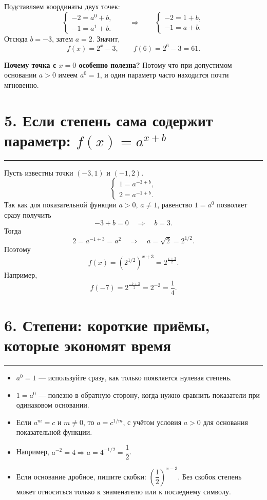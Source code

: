 \documentclass[a4paper,12pt]{article}
\newcommand{\sectionline}{\par\vspace{2pt}\noindent\color{accent}\rule{\linewidth}{0.6pt}\par\color{textgray}\vspace{4pt}}
\begin{document}
Подставляем координаты двух точек:
\[
\begin{cases}
-2=a^0+b,\\
-1=a^1+b.
\end{cases}
\qquad\Longrightarrow\qquad
\begin{cases}
-2=1+b,\\
-1=a+b.
\end{cases}
\]
Отсюда $b=-3$, затем $a=2$. Значит,
\[
  f(x)=2^x-3,
  \qquad
  f(6)=2^6-3=61.
\]

\textbf{Почему точка с $x=0$ особенно полезна?} Потому что при допустимом основании $a>0$ имеем $a^0=1$, и один параметр часто находится почти мгновенно.

\section*{5. Если степень сама содержит параметр: $f(x)=a^{x+b}$}
\sectionline
Пусть известны точки $(-3,1)$ и $(-1,2)$.
\[
\begin{cases}
1=a^{-3+b},\\
2=a^{-1+b}.
\end{cases}
\]
Так как для показательной функции $a>0$, $a\ne1$, равенство $1=a^0$ позволяет сразу получить
\[
-3+b=0\quad\Longrightarrow\quad b=3.
\]
Тогда
\[
2=a^{-1+3}=a^2
\quad\Longrightarrow\quad
 a=\sqrt2=2^{1/2}.
\]
Поэтому
\[
 f(x)=\left(2^{1/2}\right)^{x+3}=2^{\frac{x+3}{2}}.
\]
Например,
\[
 f(-7)=2^{\frac{-7+3}{2}}=2^{-2}=\frac14.
\]

\section*{6. Степени: короткие приёмы, которые экономят время}
\sectionline
\begin{itemize}
  \item $a^0=1$ — используйте сразу, как только появляется нулевая степень.
  \item $1=a^0$ — полезно в обратную сторону, когда нужно сравнить показатели при одинаковом основании.
  \item Если $a^m=c$ и $m\ne0$, то $a=c^{1/m}$, с учётом условия $a>0$ для основания показательной функции.
  \item Например, $a^{-2}=4 \Rightarrow a=4^{-1/2}=\dfrac12$.
  \item Если основание дробное, пишите скобки: $\left(\dfrac12\right)^{x-3}$. Без скобок степень может относиться только к знаменателю или к последнему символу.
\end{itemize}
\end{document}
